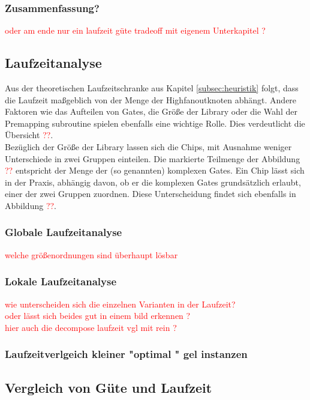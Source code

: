 \documentclass[11pt, a4paper, german]{article}
\begin{document}
\subsubsection{Zusammenfassung?}
\textcolor{red}{oder am ende nur ein laufzeit güte tradeoff mit eigenem Unterkapitel ?} 
 
 
 \subsection{Laufzeitanalyse}
 \label{subsec:laufzeitanalyse}
Aus der theoretischen Laufzeitschranke aus Kapitel \ref{subsec:heuristik} folgt, dass die Laufzeit maßgeblich von der Menge der Highfanoutknoten abhängt. Andere Faktoren wie das Aufteilen von Gates, die Größe der Library oder die Wahl der Premapping subroutine spielen ebenfalls eine wichtige Rolle. Dies verdeutlicht die Übersicht \textcolor{red}{??}.\\
 Bezüglich der Größe der Library lassen sich die Chips, mit Ausnahme weniger Unterschiede in zwei Gruppen einteilen. Die markierte Teilmenge der Abbildung \textcolor{red}{??} entspricht der Menge der (so genannten) komplexen Gates. Ein Chip lässt sich in der Praxis, abhängig davon, ob er die komplexen Gates grundsätzlich erlaubt, einer der zwei Gruppen zuordnen. Diese Unterscheidung findet sich ebenfalls in Abbildung \textcolor{red}{??}.
 
\subsubsection{Globale Laufzeitanalyse}
\textcolor{red}{welche größenordnungen sind überhaupt lösbar}

\subsubsection{Lokale Laufzeitanalyse}
\textcolor{red}{wie unterscheiden sich die einzelnen Varianten in der Laufzeit? \\ oder lässt sich beides gut in einem bild erkennen ?} \\

\textcolor{red}{hier auch die decompose laufzeit vgl mit rein ?}
 
\subsubsection{Laufzeitverlgeich kleiner "optimal " gel instanzen}


\subsection{Vergleich von Güte und  Laufzeit}
\end{document}
